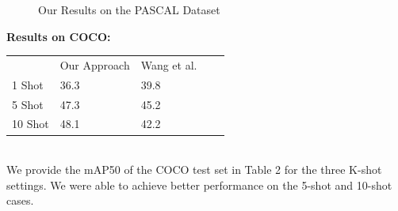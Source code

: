 \documentclass{article}
\begin{document}
\begin{figure}[h!]
\begin{minipage}{0.47\textwidth}
  \label{10 Shot}
  \end{minipage}
  \caption{Our Results on the PASCAL Dataset }
  \label{finetuning}
\end{figure}

\textbf{Results on COCO:}\\
\begin{table}[h!]
\begin{tabular}{lllll}
        & Our Approach & Wang et al. &  &  \\
1 Shot  & 36.3         & 39.8        &  &  \\
5 Shot  & 47.3         & 45.2        &  &  \\
10 Shot & 48.1         & 42.2        &  & 
\end{tabular}
\end{table}\\
We provide the mAP50 of the COCO test set in Table 2 for the three K-shot settings. We were able to achieve better performance on the 5-shot and 10-shot cases.\\
\end{document}
